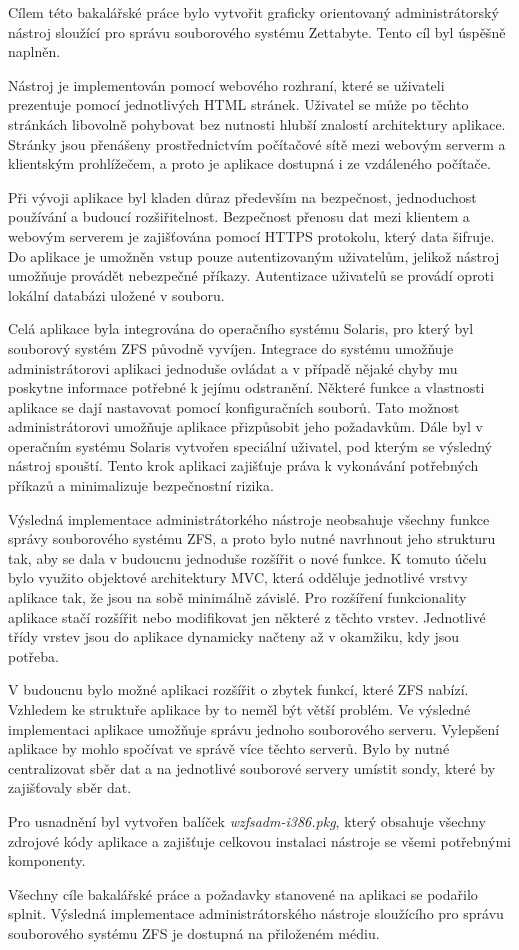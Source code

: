Cílem této bakalářské práce bylo vytvořit graficky orientovaný administrátorský nástroj sloužící pro správu souborového systému Zettabyte. Tento cíl byl úspěšně naplněn.

Nástroj je implementován pomocí webového rozhraní, které se uživateli prezentuje pomocí jednotlivých HTML stránek. Uživatel se může po těchto stránkách libovolně pohybovat bez nutnosti hlubší znalostí architektury aplikace. Stránky jsou přenášeny prostřednictvím počítačové sítě mezi webovým serverm a klientským prohlížečem, a proto je aplikace dostupná i ze vzdáleného počítače.

Při vývoji aplikace byl kladen důraz především na bezpečnost, jednoduchost používání a budoucí rozšiřitelnost. Bezpečnost přenosu dat mezi klientem a webovým serverem je zajišťována pomocí HTTPS protokolu, který data šifruje. Do aplikace je umožněn vstup pouze autentizovaným uživatelům, jelikož nástroj umožňuje provádět nebezpečné příkazy. Autentizace uživatelů se provádí oproti lokální databázi uložené v souboru.

Celá aplikace byla integrována do operačního systému Solaris, pro který byl souborový systém ZFS původně vyvíjen. Integrace do systému umožňuje administrátorovi aplikaci jednoduše ovládat a v případě nějaké chyby mu poskytne informace potřebné k jejímu odstranění. Některé funkce a vlastnosti aplikace se dají nastavovat pomocí konfiguračních souborů. Tato možnost administrátorovi umožňuje aplikace přizpůsobit jeho požadavkům. Dále byl v operačním systému Solaris vytvořen speciální uživatel, pod kterým se výsledný nástroj spouští. Tento krok aplikaci zajišťuje práva k vykonávání potřebných příkazů a minimalizuje bezpečnostní rizika.

Výsledná implementace administrátorkého nástroje neobsahuje všechny funkce správy souborového systému ZFS, a proto bylo nutné navrhnout jeho strukturu tak, aby se dala v budoucnu jednoduše rozšířit o nové funkce. K tomuto účelu bylo využito objektové architektury MVC, která odděluje jednotlivé vrstvy aplikace tak, že jsou na sobě minimálně závislé. Pro rozšíření funkcionality aplikace stačí rozšířit nebo modifikovat jen některé z těchto vrstev. Jednotlivé třídy vrstev jsou do aplikace dynamicky načteny až v okamžiku, kdy jsou potřeba.

V budoucnu bylo možné aplikaci rozšířit o zbytek funkcí, které ZFS nabízí. Vzhledem ke struktuře aplikace by to neměl být větší problém. Ve výsledné implementaci aplikace umožňuje správu jednoho souborového serveru. Vylepšení aplikace by mohlo spočívat ve správě více těchto serverů. Bylo by nutné centralizovat sběr dat a na jednotlivé souborové servery umístit sondy, které by zajišťovaly sběr dat.

Pro usnadnění byl vytvořen balíček \emph{wzfsadm-i386.pkg}, který obsahuje všechny zdrojové kódy aplikace a zajišťuje celkovou instalaci nástroje se všemi potřebnými komponenty.

Všechny cíle bakalářské práce a požadavky stanovené na aplikaci se podařilo splnit. Výsledná implementace administrátorského nástroje sloužícího pro správu souborového systému ZFS je dostupná na přiloženém médiu.




